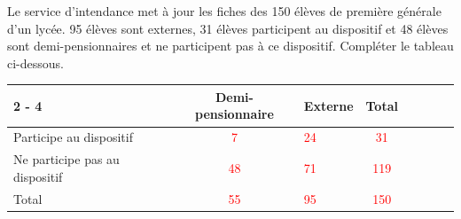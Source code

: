 \documentclass[11pt,a4paper]{article}  %
\begin{document}

Le service d'intendance met à jour les fiches des 150 élèves de première générale d'un lycée. 95 élèves sont externes, 31 élèves participent au dispositif  et 48 élèves sont demi-pensionnaires et ne participent pas à ce dispositif. Compléter le tableau ci-dessous.\\

\begin{tabular}{|Xc|Xc|Xc|Xc|}
	\cline { 2 - 4 } \multicolumn{1}{c|}{} & Demi-pensionnaire & Externe & Total \\
	\hline Participe au dispositif &  \textcolor{red}{7} & \textcolor{red}{24}  & \textcolor{red}{31}  \\
	\hline Ne participe pas au dispositif &  \textcolor{red}{48} & \textcolor{red}{71}  & \textcolor{red}{119}  \\
	\hline Total & \textcolor{red}{55}  & \textcolor{red}{95}  & \textcolor{red}{150}  \\
	\hline
\end{tabular}
\end{document}
